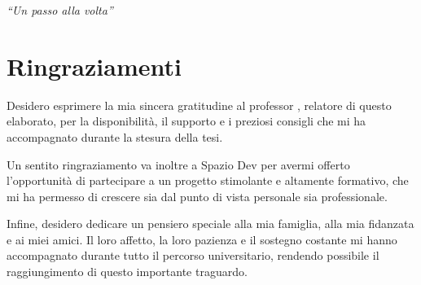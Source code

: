 \cleardoublepage
{}
{}

\begin{flushright}{
    \slshape
    ``Un passo alla volta''} \\
    
\end{flushright}

\begingroup
\let\clearpage\relax
\let\cleardoublepage\relax
\let\cleardoublepage\relax

\chapter*{Ringraziamenti}

\noindent Desidero esprimere la mia sincera gratitudine al professor \myProf, relatore di questo elaborato, per la disponibilità, il supporto e i preziosi consigli che mi ha accompagnato durante la stesura della tesi.

\vspace{0.35cm}

\noindent Un sentito ringraziamento va inoltre a Spazio Dev per avermi offerto l'opportunità di partecipare a un progetto stimolante e altamente formativo, che mi ha permesso di crescere sia dal punto di vista personale sia professionale.

\vspace{0.35cm}

\noindent Infine, desidero dedicare un pensiero speciale alla mia famiglia, alla mia fidanzata e ai miei amici. Il loro affetto, la loro pazienza e il sostegno costante mi hanno accompagnato durante tutto il percorso universitario, rendendo possibile il raggiungimento di questo importante traguardo.

\vspace{0.75cm}

\noindent{\myLocation, \myTime}
\hfill \textit{\myName}

\endgroup
